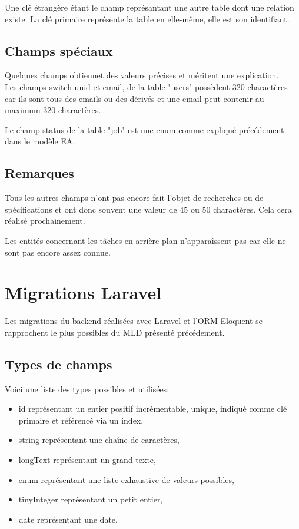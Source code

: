 \documentclass[
    iai, %
    il, %
]{heig-tb}
\begin{document}
Une clé étrangère étant le champ représantant une autre table dont une relation existe. La clé primaire représente la table en elle-même, elle est son identifiant.

\subsection{Champs spéciaux}
Quelques champs obtiennet des valeurs précises et méritent une explication.\\
Les champs switch-uuid et email, de la table "users" possèdent 320 charactères car ils sont tous des emails ou des dérivés et une email peut contenir au maximum 320 charactères.

Le champ status de la table "job" est une enum comme expliqué précédement dans le modèle EA.

\subsection{Remarques}
Tous les autres champs n'ont pas encore fait l'objet de recherches ou de spécifications et ont donc souvent une valeur de 45 ou 50 charactères. Cela cera réalisé prochainement.

Les entités concernant les tâches en arrière plan n'apparaîssent pas car elle ne sont pas encore assez connue.



\section{Migrations Laravel}

Les migrations du backend réalisées avec Laravel et l'ORM Eloquent se rapprochent le plus possibles du MLD présenté précédement.

\subsection{Types de champs}
Voici une liste des types possibles et utilisées:
\begin{itemize}
    \item id représentant un entier positif incrémentable, unique, indiqué comme clé primaire et référencé via un index,
    \item string représentant une chaîne de caractères,
    \item longText représentant un grand texte,
    \item enum représentant une liste exhaustive de valeurs possibles,
    \item tinyInteger représentant un petit entier,
    \item date représentant une date.
\end{itemize}
\end{document}
